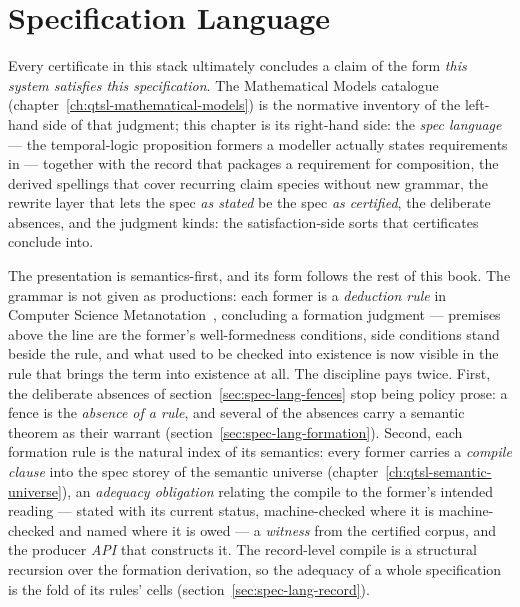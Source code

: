 \chapter{Specification Language}
\label{ch:qtsl-specification-language}


\noindent\draftmark\medskip

Every certificate in this stack ultimately concludes a claim of the
form \emph{this system satisfies this specification}. The
Mathematical Models catalogue (chapter~\ref{ch:qtsl-mathematical-models}) is the
normative inventory of the left-hand side of that judgment; this
chapter is its right-hand side: the \emph{spec language} --- the
temporal-logic proposition formers a modeller actually states
requirements in --- together with the record that packages a
requirement for composition, the derived spellings that cover
recurring claim species without new grammar, the rewrite layer that
lets the spec \emph{as stated} be the spec \emph{as certified}, the
deliberate absences, and the judgment kinds: the satisfaction-side
sorts that certificates conclude into.

The presentation is semantics-first, and its form follows the rest of
this book. The grammar is not given as productions: each former is a
\emph{deduction rule} in Computer Science
Metanotation~\cite{steele2017}, concluding a formation judgment ---
premises above the line are the former's well-formedness conditions,
side conditions stand beside the rule, and what used to be checked
into existence is now visible in the rule that brings the term into
existence at all. The discipline pays twice. First, the deliberate
absences of section~\ref{sec:spec-lang-fences} stop being policy
prose: a fence is the \emph{absence of a rule}, and several of the
absences carry a semantic theorem as their warrant
(section~\ref{sec:spec-lang-formation}). Second, each formation rule
is the natural index of its semantics: every former carries a
\emph{compile clause} into the spec storey of the semantic universe
(chapter~\ref{ch:qtsl-semantic-universe}), an \emph{adequacy
obligation} relating the compile to the former's intended reading ---
stated with its current status, machine-checked where it is
machine-checked and named where it is owed --- a \emph{witness} from
the certified corpus, and the producer \emph{API} that constructs it.
The record-level compile is a structural recursion over the formation
derivation, so the adequacy of a whole specification is the fold of
its rules' cells (section~\ref{sec:spec-lang-record}).

